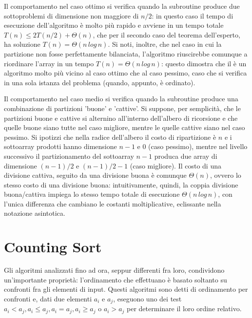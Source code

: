 \vspace*{10pt}

Il comportamento nel caso ottimo si verifica quando la subroutine  produce due sottoproblemi di dimensione non maggiore di \(n/2\): in questo caso il tempo di esecuzione dell'algoritmo è molto più rapido e avviene in un tempo totale \(T(n) \le 2T(n/2) + \Theta(n)\), che per il secondo caso del teorema dell'esperto, ha soluzione \(T(n)=\Theta(n\,log\,n)\). Si noti, inoltre, che nel caso in cui la partizione non fosse perfettamente bilanciata, l'algoritmo riuscirebbe comunque a riordinare l'array in un tempo \(T(n)=\Theta(n\,log\,n)\): questo dimostra che il  è un algoritmo molto più vicino al caso ottimo che al caso pessimo, caso che si verifica in una sola istanza del problema (quando, appunto, è ordinato). 

\vspace*{10pt}

Il comportamento nel caso medio si verifica quando la subroutine  produce una combinazione di partizioni 'buone' e 'cattive'. Si suppone, per semplicità, che le partizioni buone e cattive si alternino all'interno dell'albero di ricorsione e che quelle buone siano tutte nel caso migliore, mentre le quelle cattive siano nel caso pessimo. Si ipotizzi che nella radice dell'albero il costo di ripartizione è \(n\) e i sottoarray prodotti hanno dimensione \(n-1\) e 0 (caso pessimo), mentre nel livello successivo il partizionamento del sottoarray \(n-1\) produca due array di dimensione \((n-1)/2\) e \((n-1)/2 - 1\) (caso migliore). Il costo di una divisione cattiva, seguito da una divisione buona è comunque \(\Theta(n)\), ovvero lo stesso costo di una divisione buona: intuitivamente, quindi, la coppia divisione buona/cattiva impiega lo stesso tempo totale di esecuzione \(\Theta(n\,log\,n)\), con l'unica differenza che cambiano le costanti moltiplicative, eclissante nella notazione asintotica.

\section{Counting Sort}
Gli algoritmi analizzati fino ad ora, seppur differenti fra loro, condividono un'importante proprietà: l'ordinamento che effettuano è basato soltanto su confronti fra gli elementi di input. Questi algoritmi sono detti di ordinamento per confronti e, dati due elementi \(a_i\) e \(a_j\), eseguono uno dei test \(a_i < a_j, a_i\le a_j, a_i=a_j, a_i\ge a_j\) o \(a_i > a_j\) per determinare il loro ordine relativo. 

